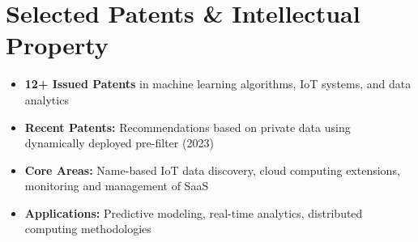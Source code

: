 \documentclass[11pt]{article}
\begin{document}
\section{Selected Patents \& Intellectual Property}
\begin{itemize}[topsep=1pt,itemsep=2pt]
    \item \textbf{12+ Issued Patents} in machine learning algorithms, IoT systems, and data analytics
    \item \textbf{Recent Patents:} Recommendations based on private data using dynamically deployed pre-filter (2023)
    \item \textbf{Core Areas:} Name-based IoT data discovery, cloud computing extensions, monitoring and management of SaaS
    \item \textbf{Applications:} Predictive modeling, real-time analytics, distributed computing methodologies
\end{itemize}
\end{document}
